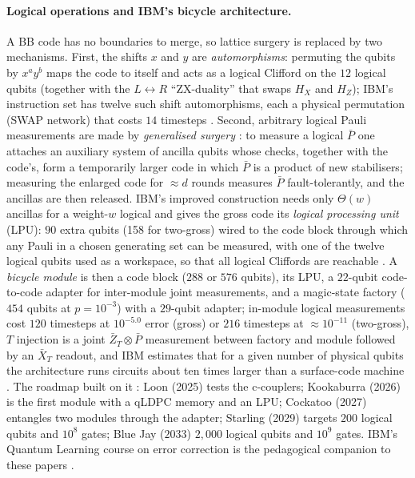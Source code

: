 \paragraph{Logical operations and IBM's bicycle architecture.} A BB code has no boundaries to merge, so lattice surgery is replaced by two mechanisms. First, the shifts $x$ and $y$ are \emph{automorphisms}: permuting the qubits by $x^ay^b$ maps the code to itself and acts as a logical Clifford on the $12$ logical qubits (together with the $L\leftrightarrow R$ ``ZX-duality'' that swaps $H_X$ and $H_Z$); IBM's instruction set has twelve such shift automorphisms, each a physical permutation (SWAP network) that costs $14$ timesteps \cite{yoder25tour}. Second, arbitrary logical Pauli measurements are made by \emph{generalised surgery} \cite{cohen22,cross24surgery}: to measure a logical $\bar P$ one attaches an auxiliary system of ancilla qubits whose checks, together with the code's, form a temporarily larger code in which $\bar P$ is a product of new stabilisers; measuring the enlarged code for $\approx d$ rounds measures $\bar P$ fault-tolerantly, and the ancillas are then released. IBM's improved construction needs only $\Theta(w)$ ancillas for a weight-$w$ logical and gives the gross code its \emph{logical processing unit} (LPU): $90$ extra qubits (158 for two-gross) wired to the code block through which any Pauli in a chosen generating set can be measured, with one of the twelve logical qubits used as a workspace, so that all logical Cliffords are reachable \cite{cross24surgery,yoder25tour}. A \emph{bicycle module} is then a code block ($288$ or $576$ qubits), its LPU, a $22$-qubit code-to-code adapter for inter-module joint measurements, and a magic-state factory ($454$ qubits at $p=10^{-3}$) with a $29$-qubit adapter; in-module logical measurements cost $120$ timesteps at $10^{-5.0}$ error (gross) or $216$ timesteps at $\approx10^{-11}$ (two-gross), $T$ injection is a joint $\bar Z_T\otimes\bar P$ measurement between factory and module followed by an $\bar X_T$ readout, and IBM estimates that for a given number of physical qubits the architecture runs circuits about ten times larger than a surface-code machine \cite{yoder25tour}. The roadmap built on it \cite{ibm-blog25,ibm-roadmap}: Loon (2025) tests the c-couplers; Kookaburra (2026) is the first module with a qLDPC memory and an LPU; Cockatoo (2027) entangles two modules through the adapter; Starling (2029) targets $200$ logical qubits and $10^8$ gates; Blue Jay ($2033$) $2{,}000$ logical qubits and $10^9$ gates. IBM's Quantum Learning course on error correction is the pedagogical companion to these papers \cite{ibm-learning-qec}.

